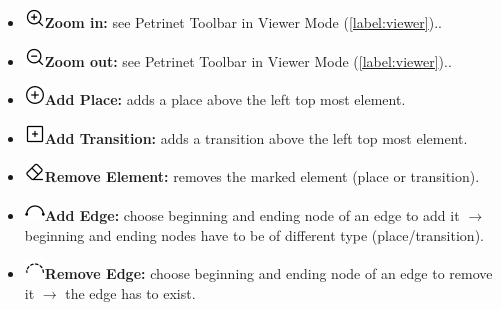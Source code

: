 \documentclass[10pt, a4paper]{article}
\begin{document}
\begin{itemize}
\item\includegraphics[scale=0.4]{../resources/images/Toolbar/zoom-in.png}\hspace{0.1cm}\textbf{Zoom in:} see Petrinet Toolbar in Viewer Mode (\ref{label:viewer})..
\item\includegraphics[scale=0.4]{../resources/images/Toolbar/zoom-out.png}\hspace{0.1cm}\textbf{Zoom out:} see Petrinet Toolbar in Viewer Mode (\ref{label:viewer})..
\item\includegraphics[scale=0.4]{../resources/images/Toolbar/add-circle.png}\hspace{0.1cm}\textbf{Add Place:} adds a place above the left top most element.
\item\includegraphics[scale=0.4]{../resources/images/Toolbar/add-square.png}\hspace{0.1cm}\textbf{Add Transition:} adds a transition above the left top most element.
\item\includegraphics[scale=0.4]{../resources/images/Toolbar/erase.png}\hspace{0.1cm}\textbf{Remove Element:} removes the marked element (place or transition).
\item\includegraphics[scale=0.4]{../resources/images/Toolbar/arc.png}\hspace{0.1cm}\textbf{Add Edge:} choose beginning and ending node of an edge to add it $\rightarrow$ beginning and ending nodes have to be of different type (place/transition).
\item\includegraphics[scale=0.4]{../resources/images/Toolbar/remove-edge.png}\hspace{0.1cm}\textbf{Remove Edge:} choose beginning and ending node of an edge to remove it $\rightarrow$ the edge has to exist.

\end{itemize}
\end{document}

